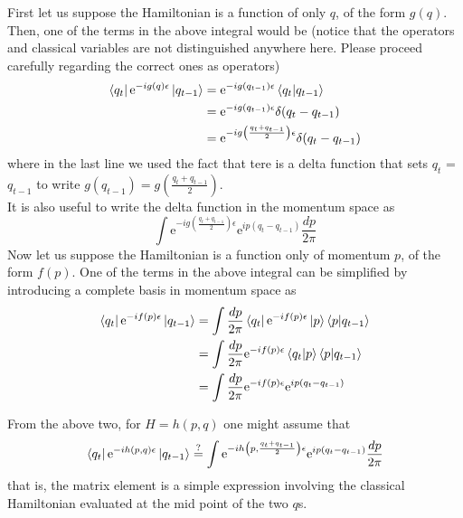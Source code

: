 \documentclass[11pt]{article}
\newcommand{\e}{\mathrm{e}}
\numberwithin{equation}{section}
\begin{document}
First let us suppose the Hamiltonian is a function of only \(q\), of the form \(g(q)\). Then, one of the terms in the above integral would be (notice that the operators and classical variables are not distinguished anywhere here. Please proceed carefully regarding the correct ones as operators)
\begin{align*}
    \bra{q_t}\e^{-ig(q)\epsilon} \ket{q_{t-1}} &= \e^{-ig(q_{t-1})\epsilon} \braket{q_t | q_{t-1}} \\
    &=\e^{-ig(q_{t-1})\epsilon} \delta(q_t - q_{t-1})\\
    &=\e^{-ig\left(\frac{q_t + q_{t-1}}{2}\right)\epsilon} \delta(q_t - q_{t-1})
\end{align*}
where in the last line we used the fact that tere is a delta function that sets \(q_t\) = \(q_{t-1}\) to write \(g(q_{t-1}) = \displaystyle g\left(\frac{q_t+q_{t-1}}{2}\right)\).\\
It is also useful to write the delta function in the momentum space as 
\begin{equation*}
    \int \e^{-ig\left(\frac{q_t + q_{t-1}}{2}\right)\epsilon} \e^{ip(q_t - q_{t-1})}\frac{dp}{2\pi} 
\end{equation*}
Now let us suppose the Hamiltonian is a function only of momentum \(p\), of the form \(f(p)\). One of the terms in the above integral can be simplified by introducing a complete basis in momentum space as 
\begin{align*}
    \bra{q_t}\e^{-if(p)\epsilon} \ket{q_{t-1}} &= \int \frac{dp}{2\pi}\bra{q_t}\e^{-if(p)\epsilon}\ket{p}\braket{p|q_{t-1}} \\
    &= \int \frac{dp}{2\pi}\e^{-if(p)\epsilon}\braket{q_t|p}\braket{p|q_{t-1}}\\
    &= \int \frac{dp}{2\pi}\e^{-if(p)\epsilon}\e^{ip(q_t - q_{t-1})}
\end{align*}

From the above two, for \(H = h(p, q)\) one might assume that 
\begin{equation*}
    \bra{q_t}\e^{-ih(p, q)\epsilon} \ket{q_{t-1}} \overset{?}{=} \int \e^{-ih\left(p, \frac{q_t + q_{t-1}}{2}\right)\epsilon} \e^{ip(q_t - q_{t-1})}\frac{dp}{2\pi}  
\end{equation*}
that is, the matrix element is a simple expression involving the classical Hamiltonian evaluated at the mid point of the two \(q\)s.\\
\end{document}
